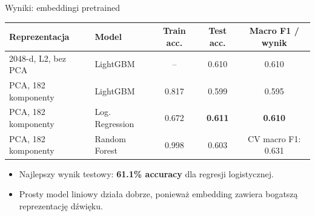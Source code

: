 \documentclass[aspectratio=1610,polish]{beamer}
\newcommand{\acc}[1]{\textbf{#1}}
\begin{document}
\begin{frame}{Wyniki: embeddingi pretrained}
	\scriptsize
	\begin{tabular}{p{}p{}ccc}
		\toprule
		Reprezentacja & Model & Train acc. & Test acc. & Macro F1 / wynik \\
		\midrule
		2048-d, L2, bez PCA & LightGBM & -- & 0.610 & 0.610 \\
		PCA, 182 komponenty & LightGBM & 0.817 & 0.599 & 0.595 \\
		PCA, 182 komponenty & Log. Regression & 0.672 & \acc{0.611} & \acc{0.610} \\
		PCA, 182 komponenty & Random Forest & 0.998 & 0.603 & CV macro F1: 0.631 \\
		\bottomrule
	\end{tabular}

	\vspace{0.6em}
	\begin{itemize}
		\item Najlepszy wynik testowy: \textbf{61.1\% accuracy} dla regresji logistycznej.
		\item Prosty model liniowy działa dobrze, ponieważ embedding zawiera bogatszą reprezentację dźwięku.
	\end{itemize}
\end{frame}
\end{document}
